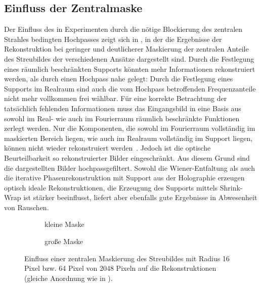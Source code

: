 \subsection{Einfluss der Zentralmaske}
Der Einfluss des in Experimenten durch die nötige Blockierung des zentralen Strahles bedingten Hochpasses zeigt sich in , in der die Ergebnisse der Rekonstruktion bei geringer und deutlicherer Maskierung der zentralen Anteile des Streubildes der verschiedenen Ansätze dargestellt sind. Durch die Festlegung eines räumlich beschränkten Supports könnten mehr Informationen rekonstruiert werden, als durch einen Hochpass nahe gelegt: Durch die Festlegung eines Supports im Realraum sind auch die vom Hochpass betroffenden Frequenzanteile nicht mehr vollkommen frei wählbar. Für eine korrekte Betrachtung der tatsächlich fehlenden Informationen muss das Eingangsbild in eine Basis aus sowohl im Real- wie auch im Fourierraum räumlich beschränkte Funktionen zerlegt werden. Nur die Komponenten, die sowohl im Fourierraum vollständig im maskierten Bereich liegen, wie auch im Realraum vollständig im Support liegen, können nicht wieder rekonstruiert werden~\cite{thibault2006}. Jedoch ist die optische Beurteilbarkeit so rekonstruierter Bilder eingeschränkt. Aus diesem Grund sind die dargestellten Bilder hochpassgefiltert.
Sowohl die Wiener-Entfaltung als auch die iterative Phasenrekonstruktion mit Support aus der Holographie erzeugen optisch ideale Rekonstruktionen, die Erzeugung des Supports mittels Shrink-Wrap ist stärker beeinflusst, liefert aber ebenfalls gute Ergebnisse in Abwesenheit von Rauschen.
\begin{figure}
	\begin{subfigure}[b]{0.48\textwidth}
		\caption{kleine Maske}
	\end{subfigure}
	\hspace*{\fill}
	\begin{subfigure}[b]{0.48\textwidth}
		\caption{große Maske}	
	\end{subfigure}
	\caption[2D Rekonstruktion: Beamstop]{Einfluss einer zentralen Maskierung des Streubildes mit Radius 16 Pixel bzw. 64 Pixel von 2048 Pixeln auf die Rekonstruktionen (gleiche Anordnung wie in ).}
	\label{fig:recon2d-mask}
\end{figure}

